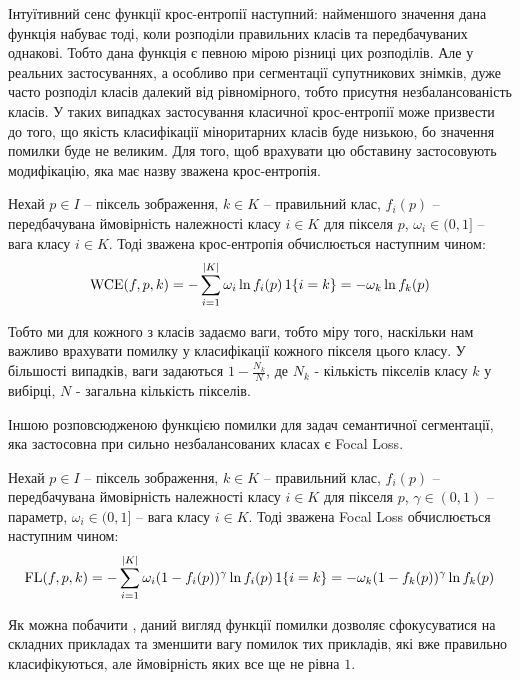 Інтуїтивний сенс функції крос-ентропії наступний: найменшого значення дана функція набуває тоді,
коли розподіли правильних класів та передбачуваних однакові. Тобто
дана функція є певною мірою різниці цих розподілів. Але у реальних
застосуваннях, а особливо при сегментації супутникових знімків,
дуже часто розподіл класів далекий від рівномірного, тобто
присутня незбалансованість класів. У таких випадках застосування
класичної крос-ентропії може призвести \cite{losses} до того, що
якість класифікації міноритарних класів буде низькою, бо
значення помилки буде не великим. Для того, щоб врахувати цю обставину
застосовують модифікацію, яка має назву зважена крос-ентропія.

\begin{definition}\label{def:wce_loss}
    Нехай $p \in I$ -- піксель зображення, $k \in K$ -- правильний клас,
    $f_i(p)$ -- передбачувана ймовірність належності класу $i \in K$ для пікселя $p$,
    $\omega_i \in (0, 1]$ -- вага класу $i \in K$.
    Тоді зважена крос-ентропія обчислюється наступним чином:
    $$ \operatorname{WCE}(f, p, k) = - \sum\limits_{i=1}^{|K|} \omega_i \ln f_i(p) \operatorname{1}\{i = k\} =
        -\omega_k \ln f_k(p) $$
\end{definition}

Тобто ми для кожного з класів задаємо ваги, тобто міру того, наскільки нам важливо
врахувати помилку у класифікації кожного пікселя цього класу. У більшості випадків,
ваги задаються $1 - \frac{N_k}{N}$, де $N_k$ - кількість пікселів класу $k$
у вибірці, $N$ - загальна кількість пікселів.

Іншою розповсюдженою функцією помилки для задач семантичної сегментації,
яка застосовна \cite{losses} при сильно незбалансованих класах є Focal Loss.

\begin{definition}\label{def:focal_loss}
    Нехай $p \in I$ -- піксель зображення, $k \in K$ -- правильний клас,
    $f_i(p)$ -- передбачувана ймовірність належності класу $i \in K$ для пікселя $p$,
    $\gamma \in (0, 1)$ -- параметр, $\omega_i \in (0, 1]$ -- вага класу $i \in K$.
    Тоді зважена Focal Loss обчислюється наступним чином:
    $$ \operatorname{FL}(f, p, k) = - \sum\limits_{i=1}^{|K|} \omega_i (1 - f_i(p))^\gamma \ln f_i(p) \operatorname{1}\{i = k\} =
        - \omega_k (1 - f_k(p))^\gamma \ln f_k(p) $$
\end{definition}

Як можна побачити \cite{losses}, даний вигляд функції помилки дозволяє
сфокусуватися на складних прикладах та зменшити
вагу помилок тих прикладів, які вже правильно класифікуються,
але ймовірність яких все ще не рівна $1$.

